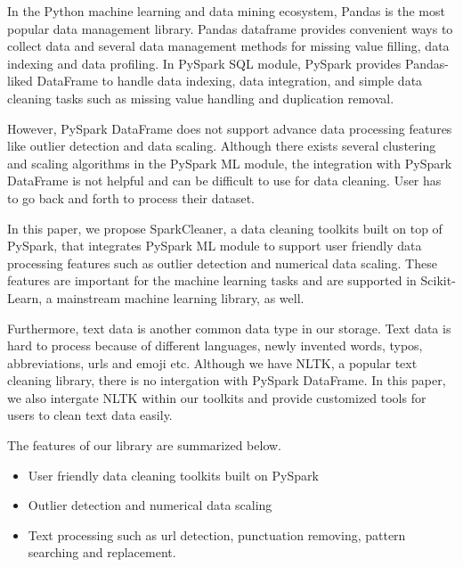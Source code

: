 \documentclass[sigconf]{acmart}
\begin{document}
In the Python machine learning and data mining ecosystem, Pandas\cite{pandas} is the most popular data management library. Pandas dataframe provides convenient ways to collect data and several data management methods for missing value filling, data indexing and data profiling. In PySpark SQL module, PySpark provides Pandas-liked DataFrame to handle data indexing, data integration, and simple data cleaning tasks such as missing value handling and duplication removal.
	
However, PySpark DataFrame does not support advance data processing features like outlier detection and data scaling. Although there exists several clustering and scaling algorithms in the PySpark ML module, the integration with PySpark DataFrame is not helpful and can be difficult to use for data cleaning. User has to go back and forth to process their dataset.  

In this paper, we propose SparkCleaner, a data cleaning toolkits built on top of PySpark, that integrates PySpark ML module to support user friendly data processing features such as outlier detection and numerical data scaling. These features are important for the machine learning tasks and are supported in Scikit-Learn\cite{scikit-learn}, a mainstream machine learning library, as well.
	
Furthermore, text data is another common data type in our storage. Text data is hard to process because of different languages, newly invented words, typos, abbreviations, urls and emoji etc. Although we have NLTK\cite{nltk}, a popular text cleaning library, there is no intergation with PySpark DataFrame. In this paper, we also intergate NLTK within our toolkits and provide customized tools for users to clean text data easily. 
	
The features of our library are summarized below.
\begin{itemize}
	\item{User friendly data cleaning toolkits built on PySpark}
	\item{Outlier detection and numerical data scaling}
	\item{Text processing such as url detection, punctuation removing, pattern searching and replacement. }
\end{itemize}	
\end{document}
